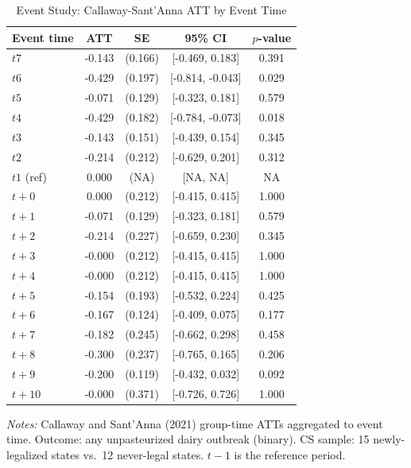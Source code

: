 \begin{table}[t]
\centering
\caption{Event Study: Callaway-Sant'Anna ATT by Event Time}
\label{tab:event}
\begin{tabular}{lcccc}
\hline\hline
Event time & ATT & SE & 95\% CI & $p$-value \\
\hline
$t  7$ & -0.143 & (0.166) & [-0.469, 0.183] & 0.391 \\
$t  6$ & -0.429 & (0.197) & [-0.814, -0.043] & 0.029 \\
$t  5$ & -0.071 & (0.129) & [-0.323, 0.181] & 0.579 \\
$t  4$ & -0.429 & (0.182) & [-0.784, -0.073] & 0.018 \\
$t  3$ & -0.143 & (0.151) & [-0.439, 0.154] & 0.345 \\
$t  2$ & -0.214 & (0.212) & [-0.629, 0.201] & 0.312 \\
$t  1$ (ref) & 0.000 & (NA) & [NA, NA] & NA \\
$t + 0$ & 0.000 & (0.212) & [-0.415, 0.415] & 1.000 \\
$t + 1$ & -0.071 & (0.129) & [-0.323, 0.181] & 0.579 \\
$t + 2$ & -0.214 & (0.227) & [-0.659, 0.230] & 0.345 \\
$t + 3$ & -0.000 & (0.212) & [-0.415, 0.415] & 1.000 \\
$t + 4$ & -0.000 & (0.212) & [-0.415, 0.415] & 1.000 \\
$t + 5$ & -0.154 & (0.193) & [-0.532, 0.224] & 0.425 \\
$t + 6$ & -0.167 & (0.124) & [-0.409, 0.075] & 0.177 \\
$t + 7$ & -0.182 & (0.245) & [-0.662, 0.298] & 0.458 \\
$t + 8$ & -0.300 & (0.237) & [-0.765, 0.165] & 0.206 \\
$t + 9$ & -0.200 & (0.119) & [-0.432, 0.032] & 0.092 \\
$t + 10$ & -0.000 & (0.371) & [-0.726, 0.726] & 1.000 \\
\hline\hline
\end{tabular}
\begin{tablenotes}[flushleft]
\small
\item \textit{Notes:} Callaway and Sant'Anna (2021) group-time ATTs aggregated to event time. Outcome: any unpasteurized dairy outbreak (binary). CS sample: 15 newly-legalized states vs.\ 12 never-legal states. $t-1$ is the reference period.
\end{tablenotes}
\end{table}
